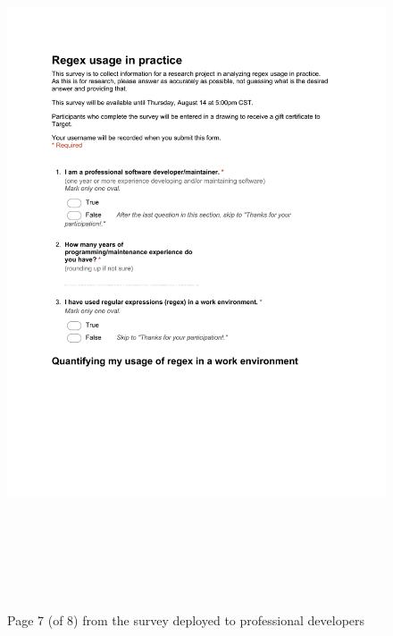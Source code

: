 \begin{figure}[!htbp]
   \centering
       \includegraphics[page=7, height=21cm,keepaspectratio]{nontex/appendix/regexUsageInPracticeSurvey}
 \caption{Page 7 (of 8) from the survey deployed to professional developers}
 \label{fig:surveyPDF7}
\end{figure}
